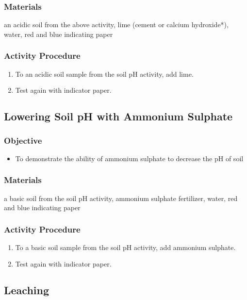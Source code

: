 \subsubsection{Materials}
an acidic soil from the above activity, lime (cement or calcium hydroxide*), water, red and blue indicating paper

\subsubsection{Activity Procedure}
\begin{enumerate}
\item{To an acidic soil sample from the soil pH activity, add lime.}
\item{Test again with indicator paper.}
\end{enumerate}

\subsection{Lowering Soil pH with Ammonium Sulphate}

\subsubsection{Objective}
\begin{itemize}
\item{To demonstrate the ability of ammonium sulphate to decrease the pH of soil}
\end{itemize}

\subsubsection{Materials}
a basic soil from the soil pH activity, ammonium sulphate fertilizer, water, red and blue indicating paper

\subsubsection{Activity Procedure}
\begin{enumerate}
\item{To a basic soil sample from the soil pH activity, add ammonium sulphate.}
\item{Test again with indicator paper.}
\end{enumerate}

\subsection{Leaching}

